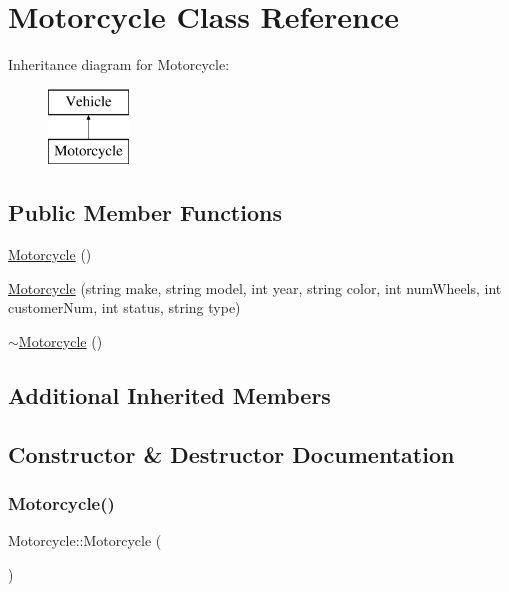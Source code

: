 \hypertarget{class_motorcycle}{}\section{Motorcycle Class Reference}
\label{class_motorcycle}
Inheritance diagram for Motorcycle\+:\begin{figure}[H]
\begin{center}
\leavevmode
\includegraphics[height=2.000000cm]{class_motorcycle}
\end{center}
\end{figure}
\subsection*{Public Member Functions}
\begin{DoxyCompactItemize}
\item 
\hyperlink{class_motorcycle_a5682a8a6156b3337eabb3a70fd59f2d6}{Motorcycle} ()
\item 
\hyperlink{class_motorcycle_ae3f0c6f4817595fea8e0486d51d12f73}{Motorcycle} (string make, string model, int year, string color, int num\+Wheels, int customer\+Num, int status, string type)
\item 
\hyperlink{class_motorcycle_ae202420292e8ce9745243b70bf873664}{$\sim$\+Motorcycle} ()
\end{DoxyCompactItemize}
\subsection*{Additional Inherited Members}


\subsection{Constructor \& Destructor Documentation}
\mbox{\label{class_motorcycle_a5682a8a6156b3337eabb3a70fd59f2d6}} 
\subsubsection{\texorpdfstring{Motorcycle()}{Motorcycle()}\hspace{0.1cm}{\footnotesize\ttfamily [1/2]}}
{\footnotesize\ttfamily Motorcycle\+::\+Motorcycle (\begin{DoxyParamCaption}{ }\end{DoxyParamCaption})}

